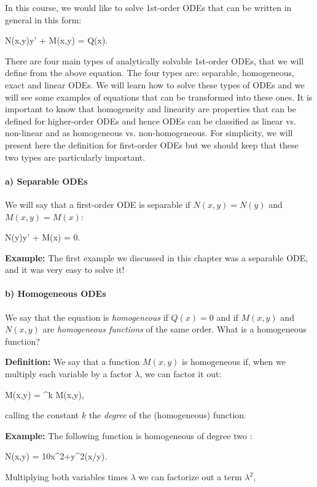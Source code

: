 In this course, we would like to solve 1st-order ODEs that can be written in general in this form:

\bnn N(x,y)y' + M(x,y) = Q(x). \enn

There are four main types of analytically solvable 1st-order ODEs, that we will define from the above equation. The four types are: separable, homogeneous, exact and linear ODEs.  We will learn how to solve these types of ODEs and we will see some examples of equations that can be transformed into these ones. It is important to know that homogeneity and linearity are properties that can be defined for higher-order ODEs and hence ODEs can be classified as linear vs. non-linear and as homogeneous vs. non-homogeneous. For simplicity, we will present here the definition for first-order ODEs but we should keep that these two types are particularly important.  

\paragraph{a) Separable ODEs}

We will say that a first-order ODE is separable if $N(x,y)=N(y)$ and $M(x,y)=M(x)$:

\bnn N(y)y' + M(x) = 0. \enn

{\bf Example: } The first example we discussed in this chapter was a separable ODE, and it was very easy to solve it!

\paragraph{b) Homogeneous ODEs}

We say that the equation is {\em homogeneous} if $Q(x)=0$ and if $M(x,y)$ and $N(x,y)$ are {\em homogeneous functions} of the same order. What is a homogeneous function? 

{\bf Definition:} We say that a function $M(x,y)$ is homogeneous if, when we multiply each variable by a factor $\lambda$, we can factor it out:

\bnn M(\lambda x,\lambda y) = \lambda^k M(x,y), \enn

calling the constant $k$ the {\em degree} of the (homogeneous) function.

{\bf Example:} The following function is homogeneous of degree two :

\bnn N(x,y) = 10x^2+y^2\sin(x/y). \enn

Multiplying both variables times $\lambda$ we can factorize out a term $\lambda^2$,

